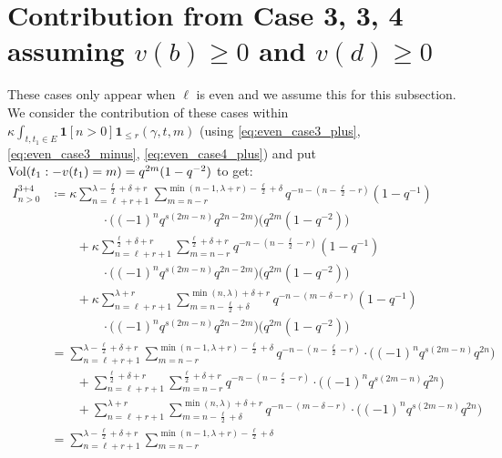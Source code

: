 \section{Contribution from Case 3\ts{+}, 3\ts{-}, 4\ts{+} assuming $v(b) \ge 0$ and $v(d) \ge 0$}
These cases only appear when $\ell$ is even and we assume this for this subsection.
We consider the contribution of these cases within
$\kappa \int_{t, t_1 \in E} \mathbf{1}[n > 0] \mathbf{1}_{\le r}(\gamma,t,m)$
(using \eqref{eq:even_case3_plus}, \eqref{eq:even_case3_minus}, \eqref{eq:even_case4_plus})
and put $\operatorname{Vol}(t_1:-v(t_1)=m) = q^{2m} (1-q^{-2})$ to get:
\begin{align*}
  I_{n > 0}^{\text{3+4}}
  &\coloneqq \kappa \sum_{n=\ell+r+1}^{\lambda-\frac{\ell}{2}+\delta+r}
    \sum_{m=n-r}^{\min(n-1, \lambda+r)-\frac{\ell}{2}+\delta}
    q^{-n-(n-\frac{\ell}{2}-r)} \left( 1 - q^{-1} \right) \\
    &\qquad\qquad\cdot \Big( (-1)^n q^{s(2m-n)} q^{2n-2m} \Big) \Big( q^{2m}(1-q^{-2}) \Big) \\
  &\qquad+ \kappa \sum_{n=\ell+r+1}^{\frac{\ell}{2}+\delta+r}
    \sum_{m=n-r}^{\frac{\ell}{2}+\delta+r}
    q^{-n-(n-\frac{\ell}{2}-r)} \left( 1 - q^{-1} \right) \\
  &\qquad\qquad\cdot \Big( (-1)^n q^{s(2m-n)} q^{2n-2m} \Big) \Big( q^{2m}(1-q^{-2}) \Big) \\
  &\qquad+ \kappa \sum_{n=\ell+r+1}^{\lambda+r}
    \sum_{m=n-\frac{\ell}{2}+\delta}^{\min(n,\lambda)+\delta+r}
    q^{-n-(m-\delta-r)} \left( 1 - q^{-1} \right) \\
    &\qquad\qquad\cdot \Big( (-1)^n q^{s(2m-n)} q^{2n-2m} \Big) \Big( q^{2m}(1-q^{-2}) \Big) \\
  &= \sum_{n=\ell+r+1}^{\lambda-\frac{\ell}{2}+\delta+r}
    \sum_{m=n-r}^{\min(n-1, \lambda+r)-\frac{\ell}{2}+\delta}
    q^{-n-(n-\frac{\ell}{2}-r)}
      \cdot \Big( (-1)^n q^{s(2m-n)} q^{2n} \Big) \\
  &\qquad+ \sum_{n=\ell+r+1}^{\frac{\ell}{2}+\delta+r}
    \sum_{m=n-r}^{\frac{\ell}{2}+\delta+r}
    q^{-n-(n-\frac{\ell}{2}-r)}
      \cdot \Big( (-1)^n q^{s(2m-n)} q^{2n} \Big) \\
  &\qquad+ \sum_{n=\ell+r+1}^{\lambda+r}
    \sum_{m=n-\frac{\ell}{2}+\delta}^{\min(n,\lambda)+\delta+r}
    q^{-n-(m-\delta-r)}
      \cdot \Big( (-1)^n q^{s(2m-n)} q^{2n} \Big) \\
  &= \sum_{n=\ell+r+1}^{\lambda-\frac{\ell}{2}+\delta+r}
    \sum_{m=n-r}^{\min(n-1, \lambda+r)-\frac{\ell}{2}+\delta}

\end{align*}
